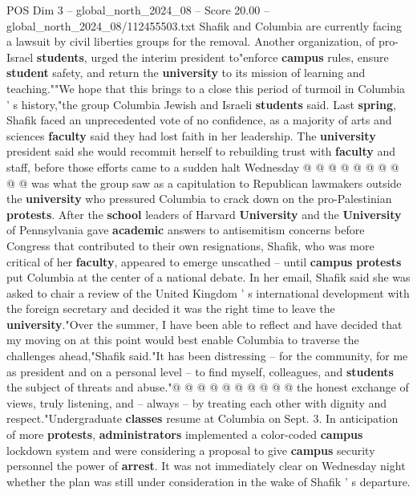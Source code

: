 \begin{textsample}{POS Dim 3 – global\_north\_2024\_08 – Score 20.00 – global\_north\_2024\_08/112455503.txt}
Shafik and Columbia are currently facing a lawsuit by civil liberties groups for the removal.
Another organization, of pro-Israel \textbf{students}, urged the interim president to"enforce \textbf{campus} rules, ensure \textbf{student} safety, and return the \textbf{university} to its mission of learning and teaching.""We hope that this brings to a close this period of turmoil in Columbia ' s history,"the group Columbia Jewish and Israeli \textbf{students} said.
Last \textbf{spring}, Shafik faced an unprecedented vote of no confidence, as a majority of arts and sciences \textbf{faculty} said they had lost faith in her leadership.
The \textbf{university} president said she would recommit herself to rebuilding trust with \textbf{faculty} and staff, before those efforts came to a sudden halt Wednesday @ @ @ @ @ @ @ @ @ @ was what the group saw as a capitulation to Republican lawmakers outside the \textbf{university} who pressured Columbia to crack down on the pro-Palestinian \textbf{protests}.
After the \textbf{school} leaders of Harvard \textbf{University} and the \textbf{University} of Pennsylvania gave \textbf{academic} answers to antisemitism concerns before Congress that contributed to their own resignations, Shafik, who was more critical of her \textbf{faculty}, appeared to emerge unscathed -- until \textbf{campus} \textbf{protests} put Columbia at the center of a national debate.
In her email, Shafik said she was asked to chair a review of the United Kingdom ' s international development with the foreign secretary and decided it was the right time to leave the \textbf{university}."Over the summer, I have been able to reflect and have decided that my moving on at this point would best enable Columbia to traverse the challenges ahead,"Shafik said."It has been distressing -- for the community, for me as president and on a personal level -- to find myself, colleagues, and \textbf{students} the subject of threats and abuse."@ @ @ @ @ @ @ @ @ @ the honest exchange of views, truly listening, and -- always -- by treating each other with dignity and respect."Undergraduate \textbf{classes} resume at Columbia on Sept. 3.
In anticipation of more \textbf{protests}, \textbf{administrators} implemented a color-coded \textbf{campus} lockdown system and were considering a proposal to give \textbf{campus} security personnel the power of \textbf{arrest}.
It was not immediately clear on Wednesday night whether the plan was still under consideration in the wake of Shafik ' s departure.

\end{textsample}

